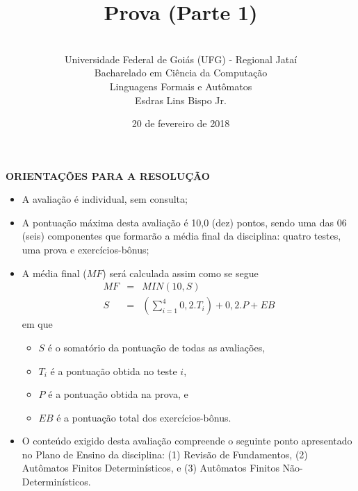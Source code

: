 \documentclass[12pt,a4paper,oneside]{article}
\author{\\Universidade Federal de Goiás (UFG) - Regional  Jataí\\Bacharelado em Ciência da Computação \\Linguagens Formais e Autômatos \\Esdras Lins Bispo Jr.}
\date{20 de fevereiro de 2018}
\title{\sc \huge Prova (Parte 1)}
\begin{document}
\maketitle

{\bf ORIENTAÇÕES PARA A RESOLUÇÃO}

\small
 
\begin{itemize}
	\item A avaliação é individual, sem consulta;
	\item A pontuação máxima desta avaliação é 10,0 (dez) pontos, sendo uma das 06 (seis) componentes que formarão a média final da disciplina: quatro testes, uma prova e exercícios-bônus;
	\item A média final ($MF$) será calculada assim como se segue
	\begin{eqnarray}
		MF & = & MIN(10, S) \nonumber \\
		S & = & (\sum_{i=1}^{4} 0,2.T_i ) + 0,2.P  + EB\nonumber
	\end{eqnarray}
	em que 
	\begin{itemize}
		\item $S$ é o somatório da pontuação de todas as avaliações,
		\item $T_i$ é a pontuação obtida no teste $i$,
		\item $P$ é a pontuação obtida na prova, e
		\item $EB$ é a pontuação total dos exercícios-bônus.
	\end{itemize}
	\item O conteúdo exigido desta avaliação compreende o seguinte ponto apresentado no Plano de Ensino da disciplina: (1) Revisão de Fundamentos, (2) Autômatos Finitos Determinísticos, e (3) Autômatos Finitos Não-Determinísticos.
\end{itemize}

\begin{center}
\end{center}

\newpage
\end{document}
